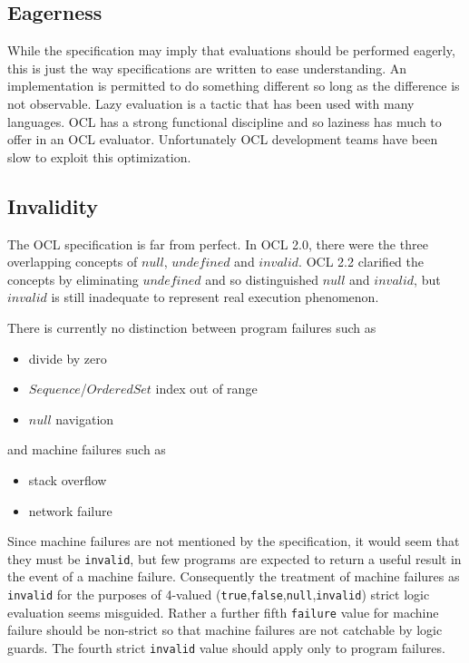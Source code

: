 \documentclass{llncs}
\begin{document}
\subsection{Eagerness}

While the specification may imply that evaluations should be performed eagerly, this is just the way specifications are written to ease understanding. An implementation is permitted to do something different so long as the difference is not observable. Lazy evaluation is a tactic that has been used with many languages. OCL has a strong functional discipline and so laziness has much to offer in an OCL evaluator. Unfortunately OCL development teams have been slow to exploit this optimization.

\subsection{Invalidity}

The OCL specification is far from perfect. In OCL 2.0, there were the three overlapping concepts of $null$, $undefined$ and $invalid$. OCL 2.2 clarified the concepts by eliminating $undefined$ and so distinguished $null$ and $invalid$, but $invalid$ is still inadequate to represent real execution phenomenon.

There is currently no distinction between program failures such as
\begin{itemize}
	\item divide by zero
	\item $Sequence$/$OrderedSet$ index out of range
	\item $null$ navigation
\end{itemize}

and machine failures such as
\begin{itemize}
	\item stack overflow
	\item network failure
\end{itemize}

Since machine failures are not mentioned by the specification, it would seem that they must be \verb$invalid$, but few programs are expected to return a useful result in the event of a machine failure. Consequently the treatment of machine failures as \verb$invalid$ for the purposes of 4-valued (\verb$true$,\verb$false$,\verb$null$,\verb$invalid$) strict logic evaluation seems misguided. Rather a further fifth \verb$failure$ value for machine failure should be non-strict so that machine failures are not catchable by logic guards. The fourth strict \verb$invalid$ value should apply only to program failures.
\end{document}
